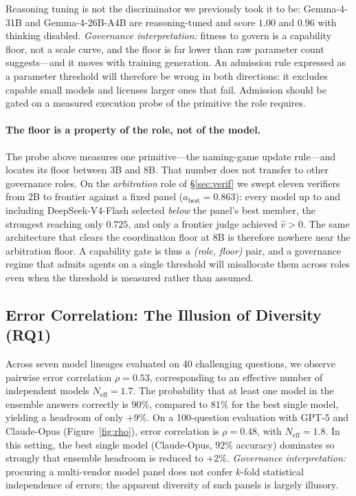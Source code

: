 \documentclass[manuscript,screen,review]{acmart}
\begin{document}
Reasoning tuning is not the discriminator we previously took it to be: Gemma-4-31B
and Gemma-4-26B-A4B are reasoning-tuned and score $1.00$ and $0.96$ with thinking
disabled. \emph{Governance interpretation:} fitness to govern is a capability
floor, not a scale curve, and the floor is far lower than raw parameter count
suggests---and it moves with training generation. An admission rule expressed as a
parameter threshold will therefore be wrong in both directions: it excludes
capable small models and licenses larger ones that fail. Admission should be
gated on a measured execution probe of the primitive the role requires.

\paragraph{The floor is a property of the role, not of the model.} The probe above
measures one primitive---the naming-game update rule---and locates its floor
between $3$B and $8$B. That number does not transfer to other governance roles. On
the \emph{arbitration} role of \S\ref{sec:verif} we swept eleven verifiers from
$2$B to frontier against a fixed panel ($a_{\mathrm{best}}{=}0.863$): every model
up to and including DeepSeek-V4-Flash selected \emph{below} the panel's best
member, the strongest reaching only $0.725$, and only a frontier judge achieved
$\hat v>0$. The same architecture that clears the coordination floor at $8$B is
therefore nowhere near the arbitration floor. A capability gate is thus a
\emph{(role, floor)} pair, and a governance regime that admits agents on a single
threshold will misallocate them across roles even when the threshold is measured
rather than assumed.

\subsection{Error Correlation: The Illusion of Diversity (RQ1)}
Across seven model lineages evaluated on 40 challenging questions, we observe pairwise error correlation $\rho = 0.53$, corresponding to an effective number of independent models $N_{\mathrm{eff}} = 1.7$. The probability that at least one model in the ensemble answers correctly is $90\%$, compared to $81\%$ for the best single model, yielding a headroom of only $+9\%$. On a 100-question evaluation with GPT-5 and Claude-Opus (Figure~\ref{fig:rho}), error correlation is $\rho = 0.48$, with $N_{\mathrm{eff}} = 1.8$. In this setting, the best single model (Claude-Opus, $92\%$ accuracy) dominates so strongly that ensemble headroom is reduced to $+2\%$. \emph{Governance interpretation:} procuring a multi-vendor model panel does not confer $k$-fold statistical independence of errors; the apparent diversity of such panels is largely illusory.
\end{document}
